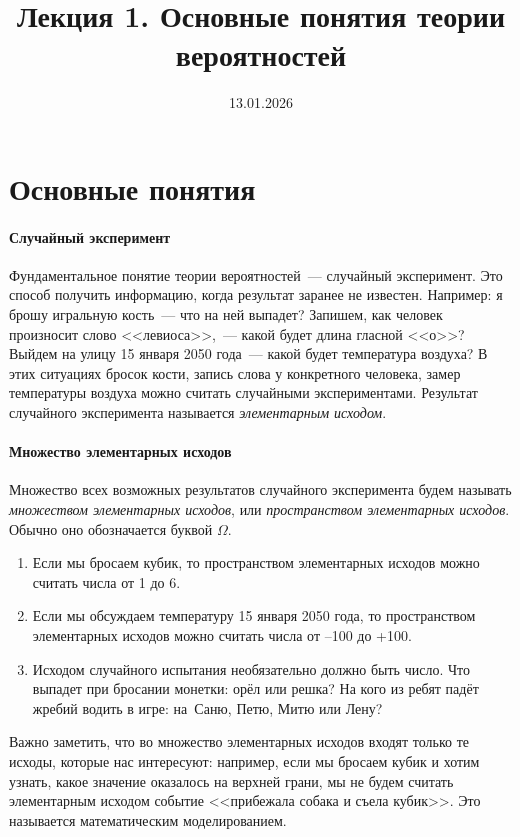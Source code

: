 \documentclass[11pt]{article}
\title{Лекция 1. Основные понятия теории вероятностей}
\date{13.01.2026}
\begin{document}
\section{Основные понятия}

\paragraph{Случайный эксперимент} Фундаментальное понятие теории вероятностей~--- случайный эксперимент. Это способ получить информацию, когда результат заранее не известен. Например: я брошу игральную кость~--- что на ней выпадет? Запишем, как человек произносит слово <<левиоса>>,~--- какой будет длина гласной <<о>>? Выйдем на улицу 15 января 2050 года~--- какой будет температура воздуха? В этих ситуациях бросок кости, запись слова у конкретного человека, замер температуры воздуха можно считать случайными экспериментами. Результат случайного эксперимента называется \emph{элементарным исходом}.

\paragraph{Множество элементарных исходов}  Множество всех возможных результатов случайного эксперимента будем называть \emph{множеством элементарных исходов}, или \emph{пространством элементарных исходов}. Обычно оно обозначается буквой $\Omega$.

\begin{examples}
\item[]
\begin{enumerate}
	\item Если мы бросаем кубик, то пространством элементарных исходов можно считать числа от 1 до 6.

	\item Если мы обсуждаем температуру 15 января 2050 года, то пространством элементарных исходов можно считать числа от --100 до +100.

	\item Исходом случайного испытания необязательно должно быть число. Что выпадет при бросании монетки: орёл или решка? На кого из ребят падёт жребий водить в игре: на~Саню, Петю, Митю или Лену?
\end{enumerate}
\end{examples}

Важно заметить, что во множество элементарных исходов входят только те исходы, которые нас интересуют: например, если мы бросаем кубик и хотим узнать, какое значение оказалось на верхней грани, мы не будем считать элементарным исходом событие <<прибежала собака и съела кубик>>. Это называется математическим моделированием.
\end{document}
